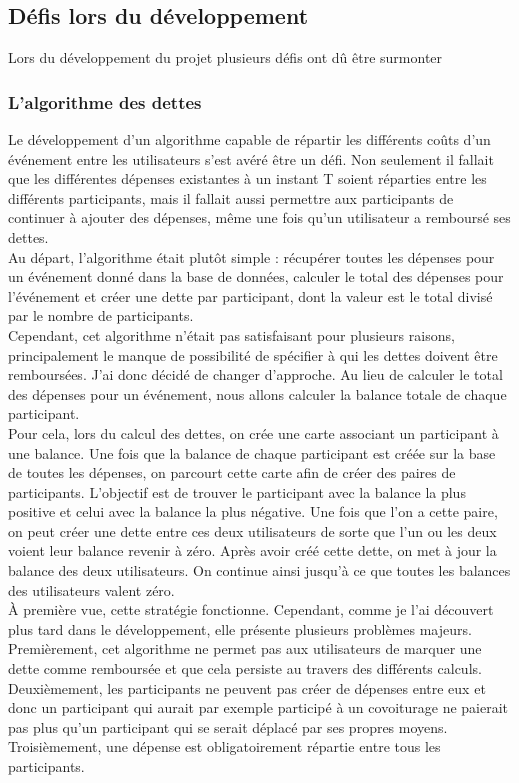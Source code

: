 \subsection{Défis lors du développement}\label{subsec:defits-lors-du-developement}
Lors du développement du projet plusieurs défis ont dû être surmonter

\subsubsection{L'algorithme des dettes}
Le développement d'un algorithme capable de répartir les différents coûts d'un événement entre les utilisateurs s'est avéré être un défi.
Non seulement il fallait que les différentes dépenses existantes à un instant T soient réparties entre les différents participants,
mais il fallait aussi permettre aux participants de continuer à ajouter des dépenses, même une fois qu'un utilisateur a remboursé ses dettes.\\

Au départ, l'algorithme était plutôt simple : récupérer toutes les dépenses pour un événement donné dans la base de données,
calculer le total des dépenses pour l'événement et créer une dette par participant, dont la valeur est le total divisé par le nombre de participants.\\

Cependant, cet algorithme n'était pas satisfaisant pour plusieurs raisons, principalement le manque de possibilité de spécifier
à qui les dettes doivent être remboursées.
J'ai donc décidé de changer d'approche.
Au lieu de calculer le total des dépenses pour un événement, nous allons calculer la balance totale de chaque participant.\\

Pour cela, lors du calcul des dettes, on crée une carte associant un participant à une balance.
Une fois que la balance de chaque participant est créée sur la base de toutes les dépenses, on parcourt cette carte afin de créer des paires de participants.
L'objectif est de trouver le participant avec la balance la plus positive et celui avec la balance la plus négative.
Une fois que l'on a cette paire, on peut créer une dette entre ces deux utilisateurs de sorte que l'un ou les deux voient leur balance revenir à zéro.
Après avoir créé cette dette, on met à jour la balance des deux utilisateurs.
On continue ainsi jusqu'à ce que toutes les balances des utilisateurs valent zéro.\\

À première vue, cette stratégie fonctionne.
Cependant, comme je l'ai découvert plus tard dans le développement, elle présente plusieurs problèmes majeurs.
Premièrement, cet algorithme ne permet pas aux utilisateurs de marquer une dette comme remboursée et que cela persiste au travers des différents calculs.
Deuxièmement, les participants ne peuvent pas créer de dépenses entre eux et donc un participant qui aurait par exemple participé à un covoiturage ne paierait pas plus qu'un participant qui se serait déplacé par ses propres moyens.
Troisièmement, une dépense est obligatoirement répartie entre tous les participants.\\

